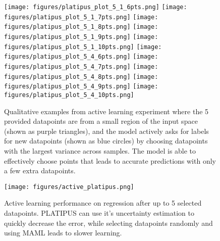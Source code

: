 \documentclass{article}
\begin{document}
\begin{figure*}[t] \centering
\texttt{[image: figures/platipus\_plot\_5\_1\_6pts.png]}
    \texttt{[image: figures/platipus\_plot\_5\_1\_7pts.png]}
    \texttt{[image: figures/platipus\_plot\_5\_1\_8pts.png]}
    \texttt{[image: figures/platipus\_plot\_5\_1\_9pts.png]}
    \texttt{[image: figures/platipus\_plot\_5\_1\_10pts.png]}
    \texttt{[image: figures/platipus\_plot\_5\_4\_6pts.png]}
    \texttt{[image: figures/platipus\_plot\_5\_4\_7pts.png]}
    \texttt{[image: figures/platipus\_plot\_5\_4\_8pts.png]}
    \texttt{[image: figures/platipus\_plot\_5\_4\_9pts.png]}
    \texttt{[image: figures/platipus\_plot\_5\_4\_10pts.png]}
\vspace{-0.2cm}
    \caption{\small Qualitative examples from active learning experiment where the 5 provided datapoints are from a small region of the input space (shown as purple triangles), and the model actively asks for labels for new datapoints (shown as blue circles) by choosing datapoints with the largest variance across samples. The model is able to effectively choose points that leads to accurate predictions with only a few extra datapoints.
    \label{fig:active_qual} }
    \vspace{-0.45cm}
\end{figure*}


\begin{wrapfigure}{h}{0.44\textwidth}
    \centering
    \vspace{-0.85cm}
    \hspace{-0.2cm}
    \texttt{[image: figures/active\_platipus.png]}
    \vspace{-0.2cm}
    \caption{\footnotesize Active learning performance on regression after up to 5 selected datapoints. PLATIPUS can use it's uncertainty estimation to quickly decrease the error, while selecting datapoints randomly and using MAML leads to slower learning.}
    \label{fig:active}
\vspace{-0.4cm}
\end{wrapfigure}
\end{document}
